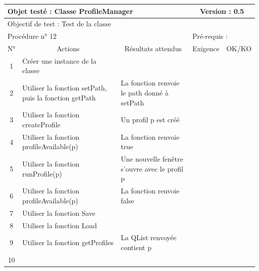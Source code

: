 \documentclass{../res/univ-projet}
\begin{document}
\begin{center}
    \begin{tabular}{|c|p{5cm}|p{5cm}|p{1.5cm}|p{1.5cm}|}
      \hline
      \multicolumn{3}{|l|}{Objet testé : Classe ProfileManager} & \multicolumn{2}{c|}{Version : 0.5}\\ \hline
      \multicolumn{5}{|l|}{Objectif de test : Test de la classe}\\ \hline
      \multicolumn{3}{|l|}{Procédure n° 12} & \multicolumn{2}{p{3cm}|}{Pré-requis : }\\ \hline
      \multicolumn{1}{|c|}{N°} & \multicolumn{1}{c|}{Actions} & \multicolumn{1}{c|}{Résultats attendus} & 
      \multicolumn{1}{c|}{Exigence} & \multicolumn{1}{c|}{OK/KO}\\ \hline
      1 & Créer une instance de la classe &  &  & \\
      2 & Utiliser la fonction setPath, puis la fonction getPath & La fonction renvoie le path donné à setPath  &  & \\
      3 & Utiliser la fonction createProfile & Un profil p est créé &  & \\
      4 & Utiliser la fonction profileAvailable(p) & La fonction renvoie true &  & \\
      5 & Utiliser la fonction runProfile(p) & Une nouvelle fenêtre s'ouvre avec le profil p &  & \\
	  6 & Utiliser la fonction profileAvailable(p) & La fonction renvoie false &  & \\
      7 & Utiliser la fonction Save &  &  & \\
      8 & Utiliser la fonction Load &  &  & \\
      9 & Utiliser la fonction getProfiles & La QList renvoyée contient p &  & \\
      10 &  &  &  &\\ 
	\hline
    \end{tabular}
    \vskip 2.2cm
	

\end{center}
\end{document}
